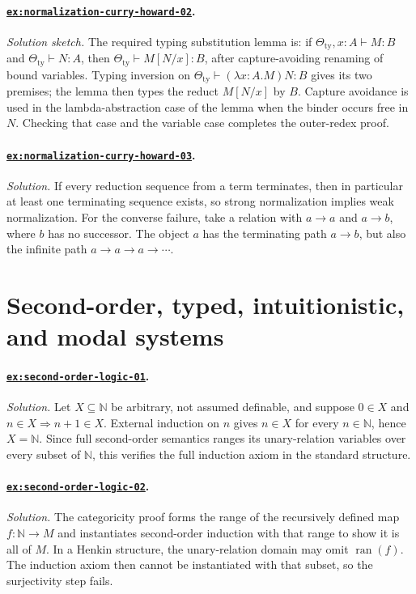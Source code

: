\documentclass[11pt,oneside,openany]{book}
\theoremstyle{definition}
\theoremstyle{plain}
\theoremstyle{remark}
\newcommand{\N}{\mathbb{N}}
\newcommand{\derives}{\vdash}
\begin{document}
\paragraph{\hyperref[ex:normalization-curry-howard-02]{\texttt{ex:normalization-curry-howard-02}}.}
\textit{Solution sketch.}  The required typing substitution lemma is: if
\(\Theta_{\mathrm{ty}},x{:}A\derives M:B\) and
\(\Theta_{\mathrm{ty}}\derives N:A\), then
\(\Theta_{\mathrm{ty}}\derives M[N/x]:B\), after capture-avoiding
renaming of bound variables.  Typing inversion on
\(\Theta_{\mathrm{ty}}\derives(\lambda x{:}A.M)N:B\) gives its two
premises; the lemma then types the reduct \(M[N/x]\) by \(B\).  Capture
avoidance is used in the lambda-abstraction case of the lemma when the
binder occurs free in \(N\).
Checking that case and the variable case completes the outer-redex proof.

\paragraph{\hyperref[ex:normalization-curry-howard-03]{\texttt{ex:normalization-curry-howard-03}}.}
\textit{Solution.}  If every reduction sequence from a term terminates, then in
particular at least one terminating sequence exists, so strong normalization
implies weak normalization.  For the converse failure, take a relation with
\(a\to a\) and \(a\to b\), where \(b\) has no successor.  The object \(a\) has
the terminating path \(a\to b\), but also the infinite path
\(a\to a\to a\to\cdots\).

\section{Second-order, typed, intuitionistic, and modal systems}

\paragraph{\hyperref[ex:second-order-logic-01]{\texttt{ex:second-order-logic-01}}.}
\textit{Solution.}  Let \(X\subseteq\N\) be arbitrary, not assumed definable,
and suppose \(0\in X\) and \(n\in X\Rightarrow n+1\in X\).  External induction
on \(n\) gives \(n\in X\) for every \(n\in\N\), hence \(X=\N\).  Since full
second-order semantics ranges its unary-relation variables over every subset of
\(\N\), this verifies the full induction axiom in the standard structure.

\paragraph{\hyperref[ex:second-order-logic-02]{\texttt{ex:second-order-logic-02}}.}
\textit{Solution.}  The categoricity proof forms the range of the recursively
defined map \(f:\N\to M\) and instantiates second-order induction with that
range to show it is all of \(M\).  In a Henkin structure, the unary-relation
domain may omit \(\operatorname{ran}(f)\).  The induction axiom then cannot be
instantiated with that subset, so the surjectivity step fails.
\end{document}
